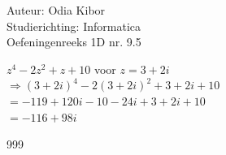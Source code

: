 \documentclass[a4paper]{article}
\begin{document}
  
\noindent \large Auteur: Odia Kibor \\
\noindent \large Studierichting: Informatica\\
\noindent \large Oefeningenreeks 1D nr. 9.5\\

\medskip

\normalsize

$z^4 - 2z^2 + z + 10$ voor $z = 3 + 2i$\\

$\Rightarrow (3 + 2i)^4 - 2(3+2i)^2 + 3 + 2i + 10$\\

$= -119 + 120i - 10 - 24i + 3 + 2i + 10$\\

$= -116 + 98i$\\


\begin{thebibliography}{999}
\end{thebibliography}
\end{document}
